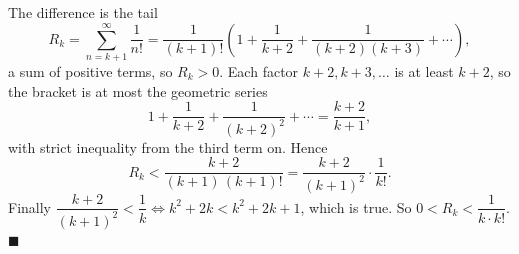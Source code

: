 The difference is the tail
\[
R_k=\sum_{n=k+1}^{\infty}\dfrac{1}{n!}=\dfrac{1}{(k+1)!}\left(1+\dfrac{1}{k+2}+\dfrac{1}{(k+2)(k+3)}+\cdots\right),
\]
a sum of positive terms, so \(R_k>0\). Each factor \(k+2,k+3,\dots\) is at least \(k+2\), so the bracket is at most the geometric series
\[
1+\dfrac{1}{k+2}+\dfrac{1}{(k+2)^2}+\cdots=\dfrac{k+2}{k+1},
\]
with strict inequality from the third term on. Hence
\[
R_k<\dfrac{k+2}{(k+1)\,(k+1)!}=\dfrac{k+2}{(k+1)^2}\cdot\dfrac{1}{k!}.
\]
Finally \(\dfrac{k+2}{(k+1)^2}<\dfrac{1}{k}\iff k^2+2k<k^2+2k+1\), which is true. So \(0<R_k<\dfrac{1}{k\cdot k!}\). \(\blacksquare\)
